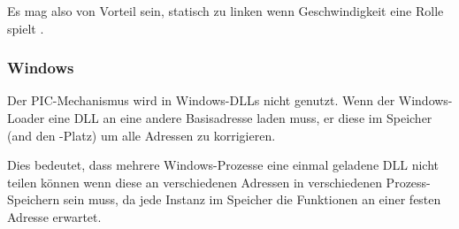 Es mag also von Vorteil sein, statisch zu linken wenn Geschwindigkeit eine Rolle spielt .

\subsubsection{Windows}

Der PIC-Mechanismus wird in Windows-DLLs nicht genutzt. Wenn der Windows-Loader eine DLL an
eine andere Basisadresse laden muss,  er diese im Speicher (and den -Platz)
um alle Adressen zu korrigieren.

Dies bedeutet, dass mehrere Windows-Prozesse eine einmal geladene DLL nicht teilen können
wenn diese an verschiedenen Adressen in verschiedenen Prozess-Speichern sein muss, da
jede Instanz im Speicher die Funktionen an einer festen Adresse erwartet.
